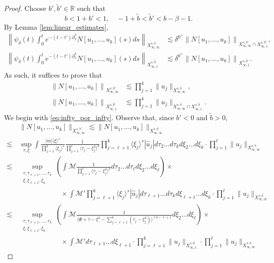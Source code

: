 \documentclass[%
11pt,  reqno]{amsart}
\newcommand{\jap}[1]{\langle #1 \rangle}
\newcommand{\5}{\textup{V}}
\newcommand{\les}{\lesssim}
\newcommand{\wt}{\widetilde}
\theoremstyle{remark}
\newcommand{\R}{\mathbb{R}}
\numberwithin{equation}{section}
\numberwithin{theorem}{section}
\begin{document}
{		
		
		\begin{proof}
Choose $b', \tilde{b}'\in \R$ such that
$$
			 b < 1+b'< 1,\quad -1+\wt{b}<\wt{b}'<b-\beta-1.
			$$
        By Lemma \ref{lem:linear_estimates}, 
        \begin{align}
				\left\|\psi_\delta(t)\int_0^te^{-(t-t')\partial_x^3}N[u_1,\dots, u_k](s)ds \right\|_{X^{s,b}_{\infty, \infty}} & \les \delta^{0^+}\left\|N[u_1,\dots, u_k] \right\|_{X^{s,b'}_{\infty, \infty}\cap X^{s,\tilde{b}'}_{\infty, 1}}, \\
				\left\|\psi_\delta(t)\int_0^te^{-(t-t')\partial_x^3}N[u_1,\dots, u_k](s)ds \right\|_{X^{s,\wt{b}}_{\infty, 1}} & \les \delta^{0^+}\left\|N[u_1,\dots, u_k] \right\|_{X^{s,\tilde{b}'}_{\infty, 1}}.
			\end{align}
            As such, it suffices to prove that
\begin{align}
				\left\|N[u_1,\dots, u_k] \right\|_{X^{s,b'}_{\infty, \infty}} & \les \prod_{j=1}^k\|u_j\|_{X^{s,b}_{\infty, \infty}},\label{eq:infty_por_infty} \\
				\left\|N[u_1,\dots, u_k] \right\|_{X^{s,\wt{b}'}_{\infty, 1}}  & \les \prod_{j=1}^k\|u_j\|_{X^{s,b}_{\infty, \infty} \cap X^{s,\tilde{b}}_{\infty,1}}.\label{eq:1_por_infty}
			\end{align}
			We begin with \eqref{eq:infty_por_infty}. Observe that, since $b'<0$ and $\tilde{b}>0$,
			\begin{align*}
				&\|N[u_1,\dots, u_k] \|_{X^{s,b'}_{\infty, \infty}} \lesssim \|N[u_1,\dots, u_k] \|_{X^{s,0}_{\infty, \infty}} \\\lesssim \ &\sup_{\tau, \xi} \int \frac{|m|\jap{\xi}^s}{\prod_{j=1}^k\jap{\xi_j}^s} \frac{1}{\prod_{j=1}^\ell \jap{\tau_j-\xi_j^3}^b}\prod_{j=\ell+1}^k \jap{\xi_j}^s|\hat{u}_j| d\tau_2\dots d\tau_k d\xi_2 \dots d\xi_k\cdot \prod_{j=1}^\ell \|u_j\|_{X_{\infty,\infty}^{s,b}}
				\\\lesssim \ &\sup_{\substack{\tau, \tau_{\ell+1},\dots,\tau_k\\ \xi, \xi_{\ell+1}, \xi_k}} \left(\int \mathcal{M} \frac{1}{\prod_{j=1}^\ell \jap{\tau_j-\xi_j^3}^b}d\tau_2\dots d\tau_\ell d\xi_2\dots d\xi_\ell\right) \times\\ & \qquad \qquad \qquad \times \int \mathcal{M}'\prod_{j=\ell+1}^k \jap{\xi_j}^s|\hat{u}_j| d\tau_{\ell+1}\dots d\tau_k d\xi_{\ell+1} \dots d\xi_k\cdot \prod_{j=1}^\ell \|u_j\|_{X_{\infty,\infty}^{s,b}}
				\\\lesssim \ &\sup_{\substack{\tau, \tau_{\ell+1},\dots,\tau_k\\ \xi, \xi_{\ell+1}, \xi_k}} \left(\int \mathcal{M} \frac{1}{ \jap{\Phi + \tau-\xi^3 - \sum_{j=\ell+1}^k (\tau_j-\xi_j^3)}^{\ell b - \ell +1}} d\xi_2\dots d\xi_\ell\right) \times\\ & \qquad \qquad \qquad \times \int  \mathcal{M}' d\tau_{\ell+1}\dots  d\xi_{\ell+1}\cdot \prod_{j=\ell+1}^k \|u_j\|_{X_{\infty,1}^{s,0}}\cdot \prod_{j=1}^\ell \|u_j\|_{X_{\infty,\infty}^{s,b}}

\end{align*}
\end{proof}}
\end{document}
